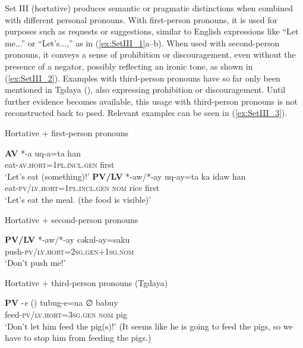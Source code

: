 Set III (hortative) produces semantic or pragmatic distinctions when combined with different personal pronouns. With first-person pronouns, it is used for purposes such as requests or suggestions, similar to English expressions like ``Let me...'' or ``Let's...,'' as in (\ref{ex:SetIII_1}a--b). When used with second-person pronouns, it conveys a sense of prohibition or discouragement, even without the presence of a negator, possibly reflecting an ironic tone, as shown in (\ref{ex:SetIII_2}). Examples with third-person pronouns have so far only been mentioned in Tgdaya (\cite[97--98]{ochiai2016phd}), also expressing prohibition or discouragement. Until further evidence becomes available, this usage with third-person pronouns is not reconstructed back to \acl{psed}. Relevant examples can be seen in (\ref{ex:SetIII_3}).


\begin{exe}
\ex Hortative + first-person pronouns \label{ex:SetIII_1}
    \begin{xlist}
    \ex \textbf{AV} *-a
    \gll *uq-a=ta han\\
    eat-\textsc{av.hort}=\textsc{1pl.incl.gen} first\\
    \glt `Let's eat (something)!'
    \ex \textbf{PV/LV} *-aw/*-ay
    \gll *uq-ay=ta ka idaw han\\
    eat-\textsc{pv/lv.hort}=\textsc{1pl.incl.gen} \textsc{nom} rice first\\
    \glt `Let's eat the meal. (the food is visible)'
    \end{xlist}
\ex Hortative + second-person pronouns \label{ex:SetIII_2}
    \begin{xlist}
    \ex \textbf{PV/LV} *-aw/*-ay
    \gll *cəkul-ay=saku\\
    push-\textsc{pv/lv.hort}=\textsc{2sg.gen+1sg.nom}\\
    \glt `Don't push me!'
    \end{xlist}
\end{exe}


\begin{exe}
\ex Hortative + third-person pronouns (Tgdaya) \label{ex:SetIII_3}
    \begin{xlist}
    \ex \textbf{PV} -\textit{e} (\cite[98]{ochiai2016phd})
    \gll tubug-e=na ∅ babuy\\
    feed-\textsc{pv/lv.hort}=\textsc{3sg.gen} \textsc{nom} pig\\
    \glt `Don't let him feed the pig(s)!' (It seems like he is going to feed the pigs, so we have to stop him from feeding the pigs.)
    \end{xlist}
\end{exe}

